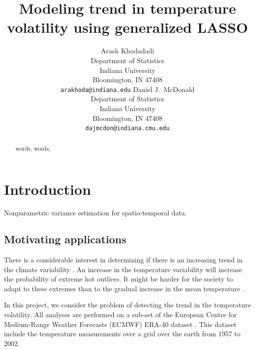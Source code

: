 \documentclass{article}
\title{Modeling trend in temperature volatility using generalized LASSO}
\author{Arash Khodadadi\\
 Department of Statistics\\
 Indiana University\\
 Bloomington, IN 47408 \\
 \texttt{arakhoda@indiana.edu}
\And
  Daniel J.\ McDonald \\
 Department of Statistics\\
 Indiana University\\
 Bloomington, IN 47408 \\
 \texttt{dajmcdon@indiana.cmu.edu}}
\begin{document}
 


\maketitle


\begin{abstract}
words, words,

\end{abstract}



\section{Introduction}

Nonparametric variance estimation for spatio-temporal data.

\subsection{Motivating applications}

There is a considerable interest in determining if there is an increasing trend in the climate variability \citep{hansen_perception_2012,huntingford_no_2013}. An increase in the temperature variability will increase the probability of extreme hot outliers. It might be harder for the society to adapt to these extremes than to the gradual increase in the mean temperature \citep{huntingford_no_2013}.

In this project, we consider the problem of detecting the trend in the temperature volatility. All analyses are performed on a sub-set of the European Centre for Medium-Range Weather Forecasts (ECMWF) ERA-40 dataset \citep{uppala_era-40_2005}. This dataset include the temperature measurements over a grid over the earth from 1957 to 2002.~\citep{VasseurDeLong2014,TrenberthZhang2014,StatenKahn2016,Screen2014,FischerBeyerle2013}
\end{document}
